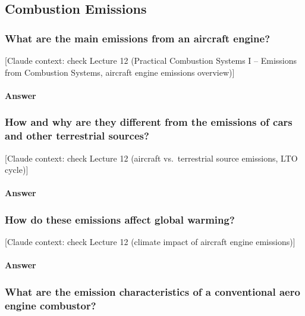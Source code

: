 \subsection{Combustion Emissions}

\subsubsection{What are the main emissions from an aircraft engine?}

{\color{gray}\footnotesize [Claude context: check Lecture 12 (Practical Combustion Systems I -- Emissions from Combustion Systems, aircraft engine emissions overview)]}

\paragraph{Answer}




\subsubsection{How and why are they different from the emissions of cars and other terrestrial sources?}

{\color{gray}\footnotesize [Claude context: check Lecture 12 (aircraft vs.\ terrestrial source emissions, LTO cycle)]}

\paragraph{Answer}




\subsubsection{How do these emissions affect global warming?}

{\color{gray}\footnotesize [Claude context: check Lecture 12 (climate impact of aircraft engine emissions)]}

\paragraph{Answer}




\subsubsection{What are the emission characteristics of a conventional aero engine combustor?}

